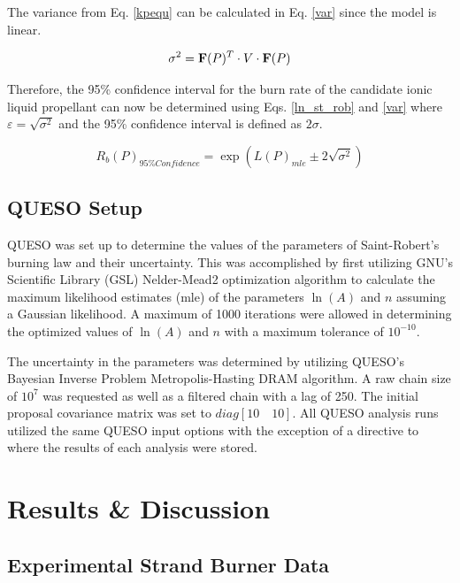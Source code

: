 \documentclass{article}
\begin{document}
The variance from Eq. \ref{kpequ} can be calculated in Eq. \ref{var} since the model is linear.

\begin{equation} \label{var}
\sigma^2 = \mathbf{F}(P)^T \cdot V \cdot \mathbf{F}(P)
\end{equation}

Therefore, the 95\% confidence interval for the burn rate of the candidate ionic liquid propellant can now be determined
using Eqs. \ref{ln_st_rob} and \ref{var} where $\varepsilon = \sqrt{\sigma^2}$ and the 95\% confidence interval is 
defined as $2\sigma$.

\begin{equation} \label{Rb95}
R_b(P)_{95\% Confidence} = \exp{(L(P)_{mle} \pm 2 \sqrt{\sigma^2})}
\end{equation}

\subsection{QUESO Setup} \label{QUESO_setup}

QUESO was set up to determine the values of the parameters of Saint-Robert's burning law and their uncertainty.
This was accomplished by first utilizing GNU's Scientific Library (GSL) Nelder-Mead2 optimization algorithm to 
calculate the maximum likelihood estimates (mle) of the parameters $\ln(A)$ and $n$ assuming a Gaussian likelihood. 
A maximum of 1000 iterations were allowed in determining the optimized values of $\ln(A)$ and $n$ with a maximum 
tolerance of $10^{-10}$. 

The uncertainty in the parameters was determined by utilizing QUESO's Bayesian Inverse Problem Metropolis-Hasting 
DRAM algorithm. A raw chain size of $10^7$ was requested as well as a filtered chain with a lag of 250. The initial 
proposal covariance matrix was set to $diag[10 \quad 10]$. All QUESO analysis runs utilized the same QUESO input 
options with the exception of a directive to where the results of each analysis were stored.

\section{Results \& Discussion} \label{results}

\subsection{Experimental Strand Burner Data} \label{resultsExpr}
\end{document}
